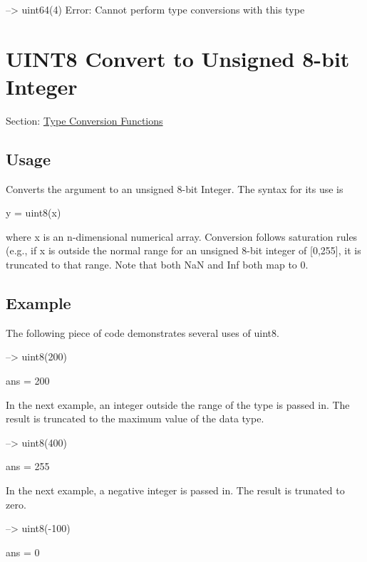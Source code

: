 \begin{DoxyVerbInclude}
--> uint64({4})
Error: Cannot perform type conversions with this type
\end{DoxyVerbInclude}
 \hypertarget{typecast_uint8}{}\section{U\-I\-N\-T8 Convert to Unsigned 8-\/bit Integer}\label{typecast_uint8}
Section\-: \hyperlink{sec_typecast}{Type Conversion Functions} \hypertarget{vtkwidgets_vtkxyplotwidget_Usage}{}\subsection{Usage}\label{vtkwidgets_vtkxyplotwidget_Usage}
Converts the argument to an unsigned 8-\/bit Integer. The syntax for its use is \begin{DoxyVerb}   y = uint8(x)
\end{DoxyVerb}
 where {\ttfamily x} is an {\ttfamily n}-\/dimensional numerical array. Conversion follows saturation rules (e.\-g., if {\ttfamily x} is outside the normal range for an unsigned 8-\/bit integer of {\ttfamily \mbox{[}0,255\mbox{]}}, it is truncated to that range. Note that both {\ttfamily Na\-N} and {\ttfamily Inf} both map to 0. \hypertarget{variables_struct_Example}{}\subsection{Example}\label{variables_struct_Example}
The following piece of code demonstrates several uses of {\ttfamily uint8}.


\begin{DoxyVerbInclude}
--> uint8(200)

ans = 
 200 
\end{DoxyVerbInclude}


In the next example, an integer outside the range of the type is passed in. The result is truncated to the maximum value of the data type.


\begin{DoxyVerbInclude}
--> uint8(400)

ans = 
 255 
\end{DoxyVerbInclude}


In the next example, a negative integer is passed in. The result is trunated to zero.


\begin{DoxyVerbInclude}
--> uint8(-100)

ans = 
 0 
\end{DoxyVerbInclude}


